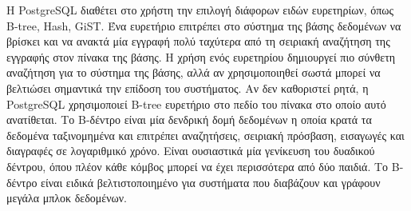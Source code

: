 \documentclass[diploma]{softlab-thesis}
\begin{document}
Η PostgreSQL διαθέτει στο χρήστη την επιλογή διάφορων ειδών ευρετηρίων, όπως B-tree, Hash, GiST. Ένα ευρετήριο επιτρέπει στο σύστημα της βάσης δεδομένων να βρίσκει 
και να ανακτά μία εγγραφή πολύ ταχύτερα από τη σειριακή αναζήτηση της εγγραφής στον πίνακα της βάσης. Η χρήση ενός ευρετηρίου δημιουργεί πιο σύνθετη αναζήτηση για το 
σύστημα της βάσης, αλλά αν χρησιμοποιηθεί σωστά μπορεί να βελτιώσει σημαντικά την επίδοση του συστήματος. Αν δεν καθοριστεί ρητά, η PostgreSQL χρησιμοποιεί B-tree 
ευρετήριο στο πεδίο του πίνακα στο οποίο αυτό ανατίθεται. Το Β-δέντρο είναι μία δενδρική δομή δεδομένων η οποία κρατά τα δεδομένα ταξινομημένα και επιτρέπει αναζητήσεις, 
σειριακή πρόσβαση, εισαγωγές και διαγραφές σε λογαριθμικό χρόνο. Είναι ουσιαστικά μία γενίκευση του δυαδικού δέντρου, όπου πλέον κάθε κόμβος μπορεί να έχει περισσότερα 
από δύο παιδιά. Το Β-δέντρο είναι ειδικά βελτιστοποιημένο για συστήματα που διαβάζουν και γράφουν μεγάλα μπλοκ δεδομένων.

\end{document}
